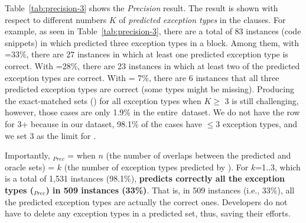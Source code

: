 Table~\ref{tab:precision-3} shows the {\em Precision} result.
The result is shown with respect to different numbers $K$ of {\em
  predicted exception types} in the  clauses. For example,
as seen in Table~\ref{tab:precision-3}, there are a total of 83
instances (code snippets) in which {\tool} predicted three exception
types in a  block. Among them, with =33\%,
there are 27 instances in which at least one predicted exception type
is correct. With =28\%, there are 23 instances in which
at least two of the predicted exception types are correct. With
 = 7\%, there are 6 instances that all three predicted
exception types are correct (some types might be missing).  Producing
the exact-matched sets () for all exception types when
$K \ge$ 3 is still challenging, however, those cases are only 1.9\% in
the entire~dataset. We do not have the row for 3+ because in our
dataset, 98.1\% of the cases have $\leq$3 exception types, and we
set 3 as the limit for {\xtype}.

Importantly, $_{Prec}$ =  when
$n$ (the number of overlaps between the predicted and oracle sets) =
$k$ (the number of exception types predicted by {\tool}).
For $k$=1..3, which is a total of 1,531 instances (98.1\%), {\bf
  {\tool} predicts correctly all the exception types
  ($_{Prec}$) in 509 instances (33\%)}. That is, in
509 instances (i.e., 33\%), all the predicted exception types are
actually the correct ones. Developers do not have to delete any
exception types in a predicted set, thus, saving their efforts.




